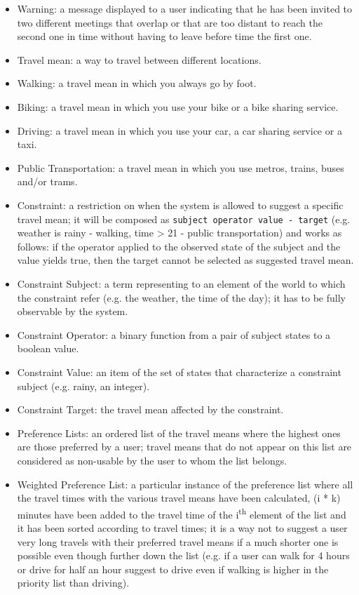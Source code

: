 \begin{itemize}
\item Warning: a message displayed to a user indicating that he has been invited to two different meetings that overlap or that are too distant to reach the second one in time without having to leave before time the first one.

\item Travel mean: a way to travel between different locations.
\item Walking: a travel mean in which you always go by foot.
\item Biking: a travel mean in which you use your bike or a bike sharing service.
\item Driving: a travel mean in which you use your car, a car sharing service or a taxi.
\item Public Transportation: a travel mean in which you use metros, trains, buses and/or trams.

\item Constraint: a restriction on when the system is allowed to suggest a specific travel mean; it will be composed as \texttt{subject operator value - target} (e.g. weather is rainy - walking, time > 21 - public transportation) and works as follows: if the operator applied to the observed state of the subject and the value yields true, then the target cannot be selected as suggested travel mean.
\item Constraint Subject: a term representing to an element of the world to which the constraint refer (e.g. the weather, the time of the day); it has to be fully observable by the system.
\item Constraint Operator: a binary function from a pair of subject states to a boolean value.
\item Constraint Value: an item of the set of states that characterize a constraint subject (e.g. rainy, an integer).
\item Constraint Target: the travel mean affected by the constraint.

\item Preference Lists: an ordered list of the travel means where the highest ones are those preferred by a user; travel means that do not appear on this list are considered as non-usable by the user to whom the list belongs.
\item Weighted Preference List: a particular instance of the preference list where all the travel times with the various travel means have been calculated, (i * k) minutes have been added to the travel time of the i\textsuperscript{th} element of the list and it has been sorted according to travel times; it is a way not to suggest a user very long travels with their preferred travel means if a much shorter one is possible even though further down the list (e.g. if a user can walk for 4 hours or drive for half an hour suggest to drive even if walking is higher in the priority list than driving).
\end{itemize}

